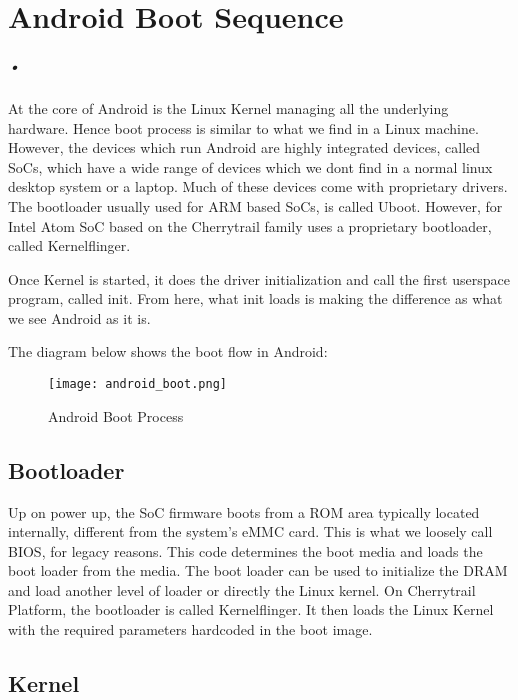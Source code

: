 

\chapter{Android Boot Sequence}
\label{android_boot}
\paragraph*{•}

\hspace{8mm} 

At the core of Android is the Linux Kernel managing all the underlying hardware. Hence boot process is
similar to what we find in a Linux machine. However, the devices which run Android are highly
integrated devices, called SoCs, which have a wide range of devices which we dont find in
a normal linux desktop system or a laptop. Much of these devices come with proprietary drivers.
The bootloader usually used for ARM based SoCs, is called Uboot. However, for Intel Atom SoC
based on the Cherrytrail family uses a proprietary bootloader, called Kernelflinger.

Once Kernel is started, it does the driver initialization and call the first userspace program,
called init. From here, what init loads is making the difference as what we see Android as it is.

The diagram below shows the boot flow in Android:


\begin{figure}[h]
  \centering
    \texttt{[image: android\_boot.png]}
    \caption{Android Boot Process}
    \label{fig:android_boot}
\end{figure}

\clearpage
\section{Bootloader}

Up on power up, the SoC firmware boots from a ROM area typically located internally,
different from the system's eMMC card. This is what we loosely call BIOS, for legacy
reasons. This code determines the boot media and loads the boot loader from the media.
The boot loader can be used to initialize the DRAM and load another level of loader
or directly the Linux kernel. On Cherrytrail Platform, the bootloader is called Kernelflinger.
It then loads the Linux Kernel with the required parameters hardcoded in the boot image.

\section{Kernel}


